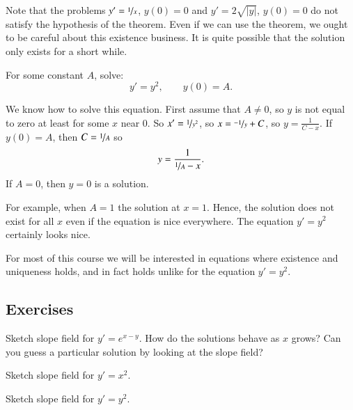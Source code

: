 \documentclass[12pt]{book}
\begin{document}
Note that the problems $y' = \nicefrac{1}{x}$, $y(0) = 0$ and 
$y' = 2 \sqrt{\lvert y \rvert}$, $y(0) = 0$ do not satisfy the hypothesis of the
theorem.
Even if we can use the theorem,
we ought to be careful about this existence business.  It is quite
possible that the solution only exists for a short while.

\begin{example}
For some constant $A$, solve:
\begin{equation*}
y' = y^2, \qquad y(0) = A .
\end{equation*}

We know how to solve this equation.  First assume that $A \not= 0$,
so $y$ is not equal to zero at least for some $x$ near 0.  So
$x' = \nicefrac{1}{y^2}$, so
$x = \nicefrac{-1}{y} + C$, so $y = \frac{1}{C-x}$.  If $y(0) = A$, then
$C = \nicefrac{1}{A}$ so
\begin{equation*}
y = \frac{1}{\nicefrac{1}{A} - x} .
\end{equation*}
If $A=0$, then $y=0$ is a solution.

For example, when $A=1$
the solution  at $x=1$.  Hence, the solution does not exist
for all $x$ even if the equation is nice everywhere.  The equation
$y' = y^2$ certainly
looks nice.
\end{example}

For most of this
course we will be interested in equations where existence and
uniqueness holds, and in fact holds  unlike for the equation
$y'=y^2$.

\subsection{Exercises}

\begin{exercise}
Sketch slope field for $y'=e^{x-y}$.  How do the solutions behave as $x$
grows?  Can you guess a particular solution by looking at the slope
field?
\end{exercise}

\begin{exercise}
Sketch slope field for $y'=x^2$.
\end{exercise}

\begin{exercise}
Sketch slope field for $y'=y^2$.
\end{exercise}
\end{document}
